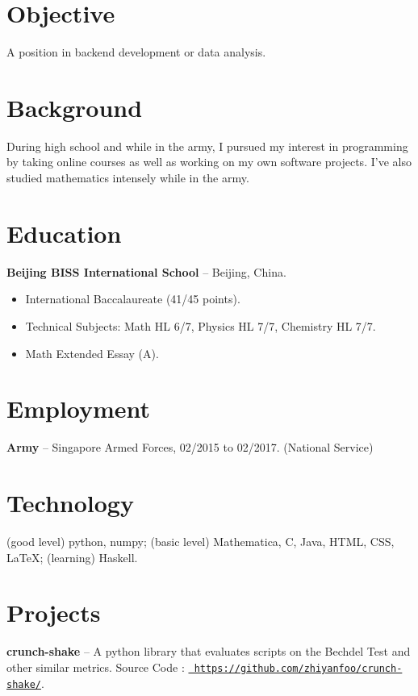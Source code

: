 \documentclass[margin]{res}
\begin{document}
\begin{resume} 
 
\section{Objective} 
A position in backend development or data analysis. 

\section{Background}
During high school and while in the army, I pursued my interest in programming
    by taking online courses as well as working on my own software projects. I've
    also studied mathematics intensely while in the army.

\section{Education} 
    {\bf Beijing BISS International School} -- Beijing, China.
\begin{itemize}
    \item International Baccalaureate (41/45 points).
    \item Technical Subjects: Math HL 6/7, Physics HL 7/7, Chemistry HL 7/7.
    \item Math Extended Essay (A).
\end{itemize}


\section{Employment}
    {\bf Army} -- Singapore Armed Forces, 02/2015 to 02/2017. (National Service)
 

\section{Technology}
    (good level) python, numpy; (basic level) Mathematica, C, Java, HTML, CSS,
    \LaTeX; (learning) Haskell.


\section{Projects}
    {\bf crunch-shake} -- A python library that evaluates scripts on
        the Bechdel Test and other similar metrics.
            Source Code : \href{https://github.com/zhiyanfoo/crunch-shake/}{\tt
            https://github.com/zhiyanfoo/crunch-shake/}.


\end{resume}
\end{document}
